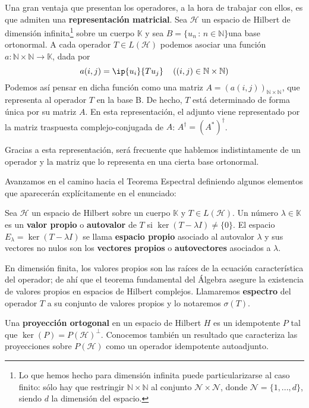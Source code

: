 \documentclass[11pt,a4paper,twoside,pdf]{article}
\numberwithin{equation}{section}
\begin{document}
	Una gran ventaja que presentan los operadores, a la hora de trabajar con ellos, es que admiten una \textbf{representación matricial}. Sea $\mathcal{H}$ un espacio de Hilbert de dimensión infinita\footnote{Lo que hemos hecho para dimensión infinita puede particularizarse al caso finito: sólo hay que restringir $\mathbb{N}\times\mathbb{N}$ al conjunto $\mathcal{N}\times \mathcal{N}$, donde $\mathcal{N}=\{1,...,d\}$, siendo $d$ la dimensión del espacio.} sobre un cuerpo $\mathbb{K}$ y sea $B=\{u_n \,:\, n\in\mathbb{N}\} $una base ortonormal. A cada operador $T\in L(\mathcal{H})$ podemos asociar una función $a:\mathbb{N}\times\mathbb{N} \longrightarrow \mathbb{K}$, dada por 
		\begin{equation}
			a(i,j)=\ip{u_i}{Tu_j} \quad \left((i,j)\in \mathbb{N}\times\mathbb{N} \right) 
		\end{equation}
	Podemos así pensar en dicha función como una matriz $A=\left( a(i,j) \right)_{\mathbb{N}\times\mathbb{N}} $, que representa al operador $T$ en la base B. De hecho, $T$ está determinado de forma única por su matriz $A$. En esta representación, el adjunto viene representado por la matriz traspuesta complejo-conjugada de $A$: $A^\dagger=\left(A^* \right)^\dagger $.
	
	Gracias a esta representación, será frecuente que hablemos indistintamente de un operador y la matriz que lo representa en una cierta base ortonormal.
	
	Avanzamos en el camino hacia el Teorema Espectral definiendo algunos elementos que aparecerán explícitamente en el enunciado:
	
	Sea $\mathcal{H}$ un espacio de Hilbert sobre un cuerpo $\mathbb{K}$ y $T\in L(\mathcal{H})$. Un número $\lambda\in\mathbb{K}$ es un \textbf{valor propio} o \textbf{autovalor} de $T$ si $\ker(T-\lambda I)\neq \{0\}$. El espacio $E_\lambda=\ker(T-\lambda I)$ se llama \textbf{espacio propio} asociado al autovalor $\lambda$ y sus vectores no nulos son los \textbf{vectores propios} o \textbf{autovectores} asociados a $\lambda$.
	
	En dimensión finita, los valores propios son las raíces de la ecuación característica del operador; de ahí que el teorema fundamental del Álgebra asegure la existencia de valores propios en espacios de Hilbert complejos. Llamaremos \textbf{espectro} del operador $T$ a su conjunto de valores propios y lo notaremos $\sigma(T)$.
	
	Una \textbf{proyección ortogonal} en un espacio de Hilbert $H$ es un idempotente $P$ tal que $\ker(P)=P(\mathcal{H})^\bot$. Conocemos también un resultado que caracteriza las proyecciones sobre $P(\mathcal{H})$ como un operador idempotente autoadjunto.
	
\end{document}
